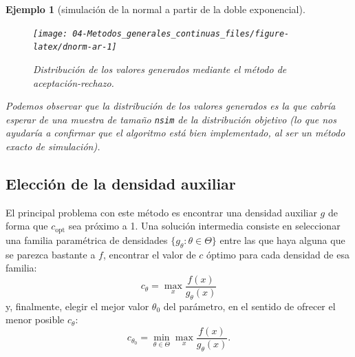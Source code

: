 \documentclass[
  10pt,
]{book}
\theoremstyle{break}
\newtheorem{example}{Ejemplo}[chapter]
\theoremstyle{nonumberplain}
\begin{document}
\begin{example}[simulación de la normal a partir de la doble exponencial]
\begin{figure}[!htbp]

{\centering \texttt{[image: 04-Metodos\_generales\_continuas\_files/figure-latex/dnorm-ar-1]} 

}

\caption{Distribución de los valores generados mediante el método de aceptación-rechazo.}\label{fig:dnorm-ar}
\end{figure}

Podemos observar que la distribución de los valores generados es la que cabría esperar de una muestra de tamaño \texttt{nsim} de la distribución objetivo (lo que nos ayudaría a confirmar que el algoritmo está bien implementado, al ser un método exacto de simulación).
\end{example}

\hypertarget{elecciuxf3n-de-la-densidad-auxiliar}{%
\subsection{Elección de la densidad auxiliar}\label{elecciuxf3n-de-la-densidad-auxiliar}}

El principal problema con este método es encontrar una densidad auxiliar \(g\) de forma que \(c_{\text{opt}}\) sea próximo a 1.
Una solución intermedia consiste en seleccionar una familia paramétrica de densidades \(\{g_{\theta} : \theta \in \Theta\}\) entre las que haya alguna que se parezca bastante a \(f\),
encontrar el valor de \(c\) óptimo para cada densidad de esa familia:
\[c_{\theta}=\max_{x}\frac{f(x)  }{g_{\theta}(x) }\]
y, finalmente, elegir el mejor valor \(\theta_{0}\) del parámetro, en el sentido de ofrecer el menor posible \(c_{\theta}\):
\[c_{\theta_{0}}=\min_{\theta\in\Theta}\max_{x}\frac{f(x) }{g_{\theta}(x)}.\]
\end{document}
